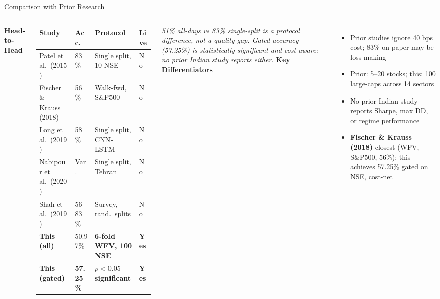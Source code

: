 \documentclass[10pt,aspectratio=43]{beamer}
\newcommand{\hl}[1]{\textcolor{primary}{\textbf{#1}}}
\newcommand{\gr}[1]{\textcolor{successgreen}{\textbf{#1}}}
\newcommand{\gd}[1]{\textcolor{secondary}{\textbf{#1}}}
\newcommand{\vsep}{\vspace{0.04cm}}
\newcommand{\AS}{\renewcommand{\arraystretch}{1.15}}
\begin{document}
\begin{frame}{Comparison with Prior Research}
  \begin{columns}[T]
      \gd{\textbf{Head-to-Head}}
      \vsep
      \AS\scriptsize
      \begin{tabular}{p{2.2cm} p{1.0cm} p{2.0cm} p{0.6cm}}
        \toprule
        \textbf{Study} & \textbf{Acc.} & \textbf{Protocol} & \textbf{Live} \\
        \midrule
        Patel et al.\ (2015)     & 83\%     & Single split, 10 NSE  & No \\
        Fischer \& Krauss (2018) & 56\%     & Walk-fwd, S\&P500     & No \\
        Long et al.\ (2019)      & 58\%     & Single split, CNN-LSTM & No \\
        Nabipour et al.\ (2020)  & Var.     & Single split, Tehran  & No \\
        Shah et al.\ (2019)      & 56--83\% & Survey, rand.\ splits  & No \\
        \midrule
        \textbf{This (all)}  & 50.97\%  & \hl{6-fold WFV, 100 NSE} & \hl{Yes} \\
        \textbf{This (gated)}& \gr{57.25\%} & \hl{$p<0.05$ significant} & \hl{Yes} \\
        \bottomrule
      \end{tabular}
      \vsep
      {\scriptsize\textit{51\% all-days vs 83\% single-split is a protocol difference, not a quality gap. Gated accuracy (57.25\%) is statistically significant and cost-aware: no prior Indian study reports either.}}
      \gd{\textbf{Key Differentiators}}
      \vsep
      \begin{itemize}\itemsep3pt
        \item Prior studies ignore 40 bps cost; 83\% on paper may be loss-making
        \item Prior: 5--20 stocks; this: 100 large-caps across 14 sectors
        \item No prior Indian study reports Sharpe, max DD, or regime performance
        \item \hl{Fischer \& Krauss (2018)} closest (WFV, S\&P500, 56\%); this achieves 57.25\% gated on NSE, cost-net
      \end{itemize}
  \end{columns}
\end{frame}
\end{document}
